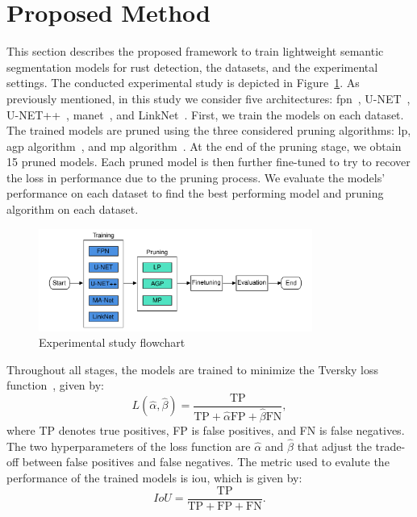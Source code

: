 \documentclass[mathematics,article,submit,pdftex,moreauthors]{Definitions/mdpi}
\begin{document}
\section{Proposed Method}
This section describes the proposed framework
to train lightweight semantic segmentation models
for rust detection, the datasets, and the experimental settings.
The conducted experimental study is depicted in Figure~\ref{fig:flowchart-study}.
As previously mentioned, in this study we consider five
architectures: \ac{fpn}~\cite{Lin2017}, U-NET~\cite{Ronneberger2015},
U-NET++~\cite{Zhou2018}, \ac{manet}~\cite{Fan2020}, and 
LinkNet~\cite{Chaurasia2017}. First, we train the models
on each dataset. The trained models are pruned
using the three considered pruning algorithms: 
\ac{lp}, \ac{agp} algorithm~\cite{Han2017},
and \ac{mp} algorithm~\cite{Sanh2020}. At the end of the 
pruning stage, we obtain 15 pruned models.
Each pruned model is then further fine-tuned to try to recover
the loss in performance due to the pruning process. We evaluate 
the models' performance on each dataset to find
the best performing model and pruning algorithm on each dataset. 

\begin{figure}[htbp]
  \begin{center}
  \includegraphics[width=0.8\textwidth]{figures/flowchart-study.pdf}
  \caption{Experimental study flowchart}
  \label{fig:flowchart-study}
  \end{center}
\end{figure}

Throughout all stages, the models are trained to minimize
the Tversky loss function~\cite{Salehi2017}, given
by:
\begin{equation}
    L(\hat{\alpha}, \hat{\beta}) = \frac{\text{TP}}{\text{TP}+
    \hat{\alpha}\text{FP} +  \hat{\beta}\text{FN}},
\end{equation}
where TP denotes true positives, FP is false positives,
and FN is false negatives. The two hyperparameters of 
the loss function are $\hat{\alpha}$ and $\hat{\beta}$
that adjust the trade-off between false positives and
false negatives. The metric used to evalute the performance of the trained
models is \ac{iou}, which is given by:
\begin{equation}
    IoU = \frac{\text{TP}}{\text{TP}+\text{FP}+\text{FN}}.
\end{equation}
\end{document}
